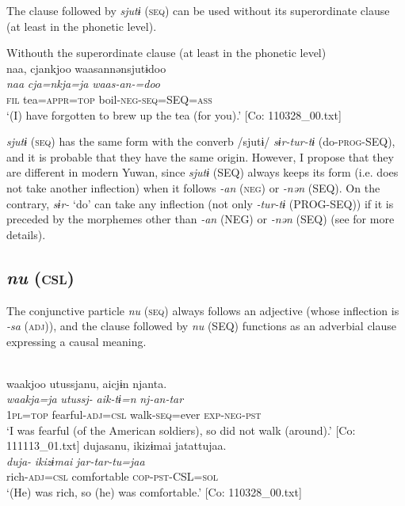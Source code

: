   The clause followed by \textit{sjutɨ} (\textsc{seq}) can be used without its superordinate clause (at least in the phonetic level).

\ea\label{ex:10.36}   Withouth the superordinate clause (at least in the phonetic level)\\
      \glll    naa,  cjankjoo  waasannənsjutɨdoo\\
    \textit{naa}  \textit{cja=nkja=ja}  \textit{waas-an-=doo}\\
    \textsc{fil}  tea=\textsc{appr}=\textsc{top}  boil-\textsc{neg}-\textsc{seq}=SEQ=\textsc{ass}\\
\glt     ‘(I) have forgotten to brew up the tea (for you).’  [Co: 110328\_00.txt]
\z

  \textit{sjutɨ} (\textsc{seq}) has the same form with the converb /sjutɨ/ \textit{sɨr-tur-tɨ} (do-\textsc{prog}-SEQ), and it is probable that they have the same origin. However, I propose that they are different in modern Yuwan, since \textit{sjutɨ} (SEQ) always keeps its form (i.e. does not take another inflection) when it follows \textit{{}-an} (\textsc{neg}) or \textit{{}-nən} (SEQ). On the contrary, \textit{sɨr-} ‘do’ can take any inflection (not only \textit{{}-tur-tɨ} (PROG-SEQ)) if it is preceded by the morphemes other than \textit{{}-an} (NEG) or \textit{{}-nən} (SEQ) (see  for more details).

\subsection{\textit{nu} (\textsc{csl})}\label{sec:10.2.5}

The conjunctive particle \textit{nu} (\textsc{seq}) always follows an adjective (whose inflection is \textit{{}-sa} (\textsc{adj})), and the clause followed by \textit{nu} (SEQ) functions as an adverbial clause expressing a causal meaning.

\ea\label{ex:10.37} 
  \ea\relax [= (9-44 c)]\\
      \glll    waakjoo  utussjanu,  aicjɨn  njanta.\\
      \textit{waakja=ja}  \textit{utussj-}  \textit{aik-tɨ=n}  \textit{nj-an-tar}\\
      1\textsc{pl}=\textsc{top}  fearful-\textsc{adj}=\textsc{csl}  walk-\textsc{seq}=ever  \textsc{exp}-\textsc{neg}-\textsc{pst}\\
      \glt       ‘I was fearful (of the American soldiers), so did not walk (around).’ [Co: 111113\_01.txt]
  \ex   %
      \glll    dujasanu,  ikizɨmai  jatattujaa.\\
      \textit{duja-}  \textit{ikizɨmai}  \textit{jar-tar-tu=jaa}\\
      rich-\textsc{adj}=\textsc{csl}  comfortable  \textsc{cop}-\textsc{pst}-CSL=\textsc{sol}\\
      \glt       ‘(He) was rich, so (he) was comfortable.’ [Co: 110328\_00.txt]
    \z
\z

